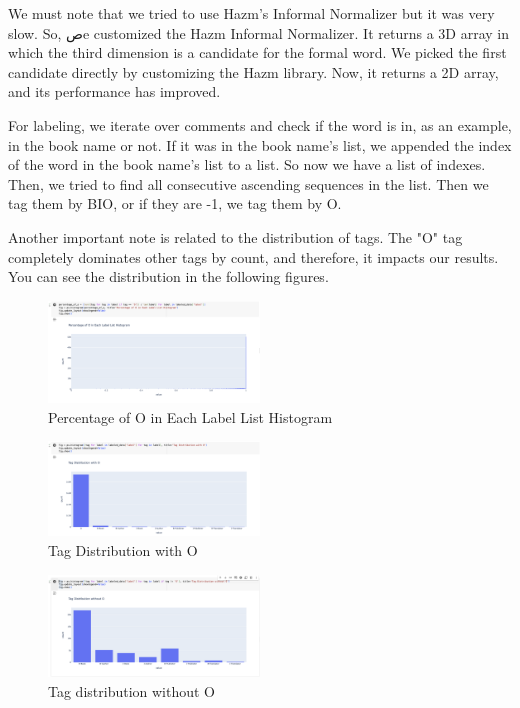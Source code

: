 \documentclass{solutionclass} %
\begin{document}
We must note that we tried to use Hazm's Informal Normalizer but it was very slow. So, صe customized the Hazm Informal Normalizer. It returns a 3D array in which the third dimension is a candidate for the formal word. We picked the first candidate directly by customizing the Hazm library. Now, it returns a 2D array, and its performance has improved.

For labeling, we iterate over comments and check if the word is in, as an example, in the book name or not. If it was in the book name’s list, we appended the index of the word in the book name’s list to a list. So now we have a list of indexes. Then, we tried to find all consecutive ascending sequences in the list. Then we tag them by BIO, or if they are -1, we tag them by O.


Another important note is related to the distribution of tags. The "O" tag completely dominates other tags by count, and therefore, it impacts our results. You can see the distribution in the following figures.



\begin{figure}[h!]
    \caption{Percentage of O in Each Label List Histogram}
    \centering
    \includegraphics[width=0.5\textwidth]{img/2/1.png}
\end{figure}

\begin{figure}[h!]
    \caption{ Tag Distribution with O}
    \centering
    \includegraphics[width=0.5\textwidth]{img/2/2.png}
\end{figure}


\begin{figure}[h!]
    \caption{Tag distribution without O}
    \centering
    \includegraphics[width=0.5\textwidth]{img/2/3.png}
\end{figure}
\end{document}
